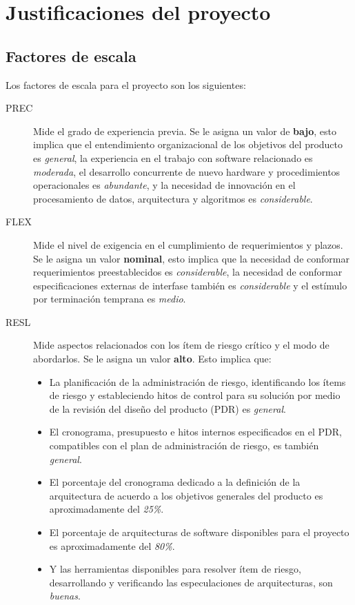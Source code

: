 \documentclass[11pt,a4paper,spanish,twoside]{book}
\begin{document}
\chapter{Justificaciones del proyecto}
\section{Factores de escala}
Los factores de escala para el proyecto son los siguientes:
\begin{description}
\item[PREC] Mide el grado de experiencia previa. Se le asigna un valor de
\textbf{bajo}, esto implica que el entendimiento organizacional de los
objetivos del producto es \emph{general}, la experiencia en el trabajo con 
software relacionado es \emph{moderada}, el desarrollo concurrente de nuevo
hardware y procedimientos operacionales es \emph{abundante}, y la necesidad
de innovación en el procesamiento de datos, arquitectura y algoritmos es
\emph{considerable}.

\item[FLEX] Mide el nivel de exigencia en el cumplimiento de requerimientos
y plazos. Se le asigna un valor \textbf{nominal}, esto implica que la
necesidad de conformar requerimientos preestablecidos es \emph{considerable},
la necesidad de conformar especificaciones externas de interfase también es
\emph{considerable} y el estímulo por terminación temprana es \emph{medio}.

\item[RESL] Mide aspectos relacionados con los ítem de riesgo crítico y el
modo de abordarlos. Se le asigna un valor \textbf{alto}. Esto implica que:
\begin{itemize}
\item La planificación de la administración de riesgo, identificando los
ítems de riesgo y estableciendo hitos de control para su solución por medio
de la revisión del diseño del producto (PDR) es \emph{general}.
\item El cronograma, presupuesto e hitos internos especificados en el PDR,
compatibles con el plan de administración de riesgo, es también \emph{general}.
\item El porcentaje del cronograma dedicado a la definición de la arquitectura
de acuerdo a los objetivos generales del producto es aproximadamente del
\emph{25\%}.
\item El porcentaje de arquitecturas de software disponibles para el proyecto
es aproximadamente del \emph{80\%}.
\item Y las herramientas disponibles para resolver ítem de riesgo,
desarrollando y verificando las especulaciones de arquitecturas, son
\emph{buenas}.
\end{itemize}


\end{description}
\end{document}
